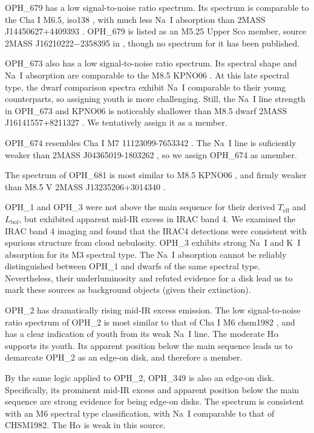OPH\_679 has a low signal-to-noise ratio spectrum.  Its spectrum is comparable to the Cha I M6.5, iso138 \citep{2004ApJ...602..816L}, with much less Na~I absorption than 2MASS J14450627+4409393 \citep{2003AJ....126.2421C}.  OPH\_679 is listed as an M5.25 Upper Sco member, source 2MASS J16210222$-$2358395 in \citet{2012ApJ...758...31L}, though no spectrum for it has been published.  

OPH\_673 also has a low signal-to-noise ratio spectrum.  Its spectral shape and Na~I absorption are comparable to the M8.5 KPNO06 \citep{1998AJ....115.2074B,2003ApJ...593.1093L}.  At this late spectral type, the dwarf comparison spectra exhibit Na~I comparable to their young counterparts, so assigning youth is more challenging.  Still, the Na~I line strength in OPH\_673 and KPNO06 is noticeably shallower than M8.5 dwarf 2MASS J16141557+8211327 \citep{2007AJ....133..439C}.  We tentatively assign it as a member.

OPH\_674 resembles Cha I M7 11123099-7653342 \citep{2004ApJ...602..816L}.  The Na~I line is suficiently weaker than 2MASS J04365019-1803262 \citep{2007AJ....133..439C}, so we assign OPH\_674 as amember.  

The spectrum of OPH\_681 is most similar to M8.5 KPNO06 \citep{1998AJ....115.2074B,2003ApJ...593.1093L}, and firmly weaker than M8.5 V 2MASS J13235206+3014340 \citep{2007AJ....133..439C}.  

OPH\_1 and OPH\_3 were not above the main sequence for their derived $T_{\mathrm{eff}}$ and $L_{\mathrm{bol}}$, but exhibited apparent mid-IR excess in IRAC band 4.  We examined the IRAC band 4 imaging and found that the IRAC4 detections were consistent with spurious structure from cloud nebulosity.  OPH\_3 exhibits strong Na~I and K~I absorption for its M3 spectral type.  The Na~I absorption cannot be reliably distinguished between OPH\_1 and dwarfs of the same spectral type.  Nevertheless, their underluminosity and refuted evidence for a disk lead us to mark these sources as background objects (given their extinction).

OPH\_2 has dramatically rising mid-IR excess emission.  The low signal-to-noise ratio spectrum of OPH\_2 is most similar to that of Cha I M6 chsm1982 \citep{2004ApJ...602..816L}, and has a clear indication of youth from its weak Na~I line.  The moderate H$\alpha$ supports its youth.  Its apparent position below the main sequence leads us to demarcate OPH\_2 as an edge-on disk, and therefore a member.

By the same logic applied to OPH\_2, OPH\_349 is also an edge-on disk.  Specifically, its prominent mid-IR excess and apparent position below the main sequence are strong evidence for being edge-on disks.  The spectrum is consistent with an M6 spectral type classification, with Na~I comparable to that of CHSM1982.  The H$\alpha$ is weak in this source.

